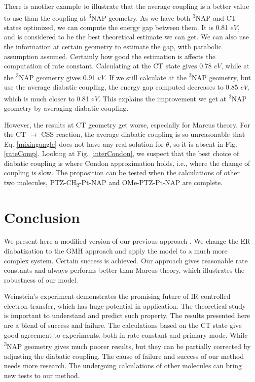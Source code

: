 There is another example to illustrate that the average coupling is a better value to use than the coupling at \textsuperscript{3}NAP geometry. As we have both \textsuperscript{3}NAP and CT states optimized, we can compute the energy gap between them. It is 0.81 $eV$, and is considered to be the best theoretical estimate we can get. We can also use the information at certain geometry to estimate the gap, with parabolic assumption assumed. Certainly how good the estimation is affects the computation of rate constant. Calculating at the CT state gives 0.78 $eV$, while at the \textsuperscript{3}NAP geometry gives 0.91 $eV$. If we still calculate at the \textsuperscript{3}NAP geometry, but use the average diabatic coupling, the energy gap computed decreases to 0.85 $eV$, which is much closer to 0.81 $eV$. This explains the improvement we get at \textsuperscript{3}NAP geometry by averaging diabatic coupling.

However, the results at CT geometry get worse, especially for Marcus theory. For the CT $\rightarrow$  CSS reaction, the average diabatic coupling is so unreasonable that Eq. \ref{mixingangle} does not have any real solution for $\theta$, so it is absent in Fig. \ref{rateComp}. Looking at Fig. \ref{interCondon}, we suspect that the best choice of diabatic coupling is where Condon approximation holds, i.e., where the change of coupling is slow. The proposition can be tested when the calculations of other two molecules, PTZ-CH\textsubscript{2}-Pt-NAP and OMe-PTZ-Pt-NAP are complete.


\section{Conclusion} %
We present here a modified version of our previous approach \cite{yang2014intramolecular,yang2015computing}. We change the ER diabatization to the GMH approach and apply the model to a much more complex system. Certain success is achieved. Our approach gives reasonable rate constants and always performs better than Marcus theory, which illustrates the robustness of our model.

Weinstein's experiment demonstrates the promising future of IR-controlled electron transfer, which has huge potential in application. The theoretical study is important to understand and predict such property. The results presented here are a blend of success and failure. The calculations based on the CT state give good agreement to experiments, both in rate constant and primary mode. While \textsuperscript{3}NAP geometry gives much poorer results, but they can be partially corrected by adjusting the diabatic coupling. The cause of failure and success of our method needs more research. The undergoing calculations of other molecules can bring new tests to our method.



